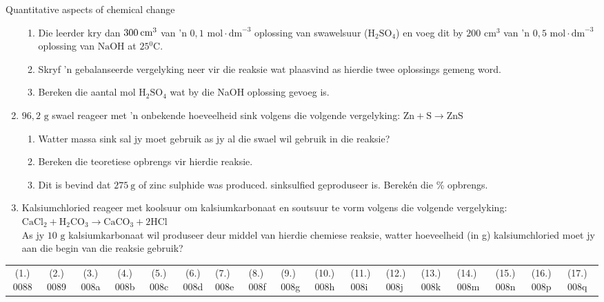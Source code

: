 \begin{eocexercises}{Quantitative aspects of chemical change}
\begin{enumerate}[noitemsep, label=\textbf{\arabic*}. ]
\begin{enumerate}[noitemsep, label=\textbf{\alph*}. ]
 \item Die leerder kry dan $300\phantom{\rule{2pt}{0ex}}{\text{cm}}^{3}$ van  'n $0,1 \text{ mol} \cdot {\text{dm}}^{-3}$ oplossing van swawelsuur ($\text{H}{}_{2}\text{SO}{}_{4}$) en voeg dit by $200 {\text{ cm}}^{3}$ van  'n $0,5 \text{ mol} \cdot {\text{dm}}^{-3}$ oplossing van $\text{NaOH}$ at $25{}^{0}\text{C}$.
 \item Skryf  'n gebalanseerde vergelyking neer vir die reaksie wat plaasvind as hierdie twee oplossings gemeng word.
 \item Bereken die aantal mol $\text{H}{}_{2}\text{SO}{}_{4}$ wat by die NaOH oplossing gevoeg is.
\end{enumerate}
\item $96,2 \text{ g}$ swael reageer met  'n onbekende hoeveelheid sink volgens die volgende vergelyking: 
$\text{Zn}+\text{S}\to \text{ZnS}$
 \begin{enumerate}[noitemsep, label=\textbf{\alph*}. ] 
 \item Watter massa sink sal jy moet gebruik as jy al die swael wil gebruik in die reaksie?
 \item Bereken die teoretiese opbrengs vir hierdie reaksie.
 \item Dit is bevind dat $275~\text{g}$ of zinc sulphide was produced. sinksulfied geproduseer is. Berekén die \% opbrengs.
 \end{enumerate}
\item Kalsiumchloried reageer met koolsuur om kalsiumkarbonaat en soutsuur te vorm volgens die volgende vergelyking:\\
${\text{CaCl}}_{2}+{\text{H}}_{2}{\text{CO}}_{3}\to {\text{CaCO}}_{3}+2\text{HCl}$\\
As jy $10 \text{ g}$ kalsiumkarbonaat wil produseer deur middel van hierdie chemiese reaksie, watter hoeveelheid (in g) kalsiumchloried moet jy aan die begin van die reaksie gebruik?
                \end{enumerate}
\practiceinfo
\par 
 \par \begin{tabular}[h]{cccccc}
 (1.) 0088  &  (2.) 0089  &  (3.) 008a  &  (4.) 008b  &  (5.) 008c  &  (6.) 008d  &  (7.) 008e  &  (8.) 008f  &  (9.) 008g  &  (10.) 008h  &  (11.) 008i  &  (12.) 008j  &  (13.) 008k  &  (14.) 008m  &  (15.) 008n  & (16.) 008p & (17.) 008q \end{tabular}
\end{eocexercises}
